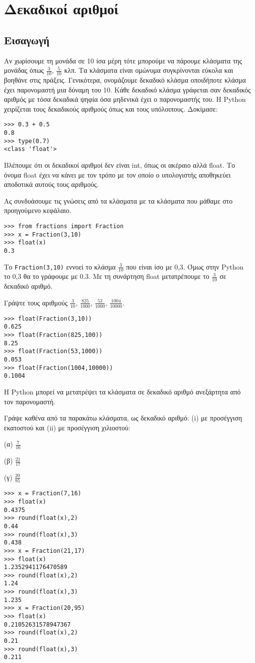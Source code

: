 \chapter{Δεκαδικοί αριθμοί}
\section{Εισαγωγή}
Αν χωρίσουμε τη μονάδα σε 10 ίσα μέρη τότε μπορούμε να πάρουμε κλάσματα της μονάδας όπως $\frac{3}{10}$, $\frac{5}{10}$ κλπ. Τα κλάσματα είναι ομώνυμα συγκρίνονται εύκολα και βοηθάνε στις πράξεις. 
Γενικότερα, ονομάζουμε δεκαδικό κλάσμα οποιδήποτε κλάσμα έχει παρονομαστή μια δύναμη του 10. Κάθε δεκαδικό κλάσμα γράφεται σαν δεκαδικός αριθμός με τόσα δεκαδικά ψηφία όσα μηδενικά έχει ο παρονομαστής του.
Η Python χειρίζεται τους δεκαδικούς αριθμούς όπως και τους υπόλοιπους.
Δοκίμασε:
\begin{lstlisting}
>>> 0.3 + 0.5
0.8
>>> type(0.7)
<class 'float'>
\end{lstlisting}

Βλέπουμε ότι οι δεκαδικοί αριθμοί δεν είναι int, όπως οι ακέραιο αλλά float. Το όνομα float έχει να κάνει με τον τρόπο με τον οποίο ο υπολογιστής αποθηκεύει αποδοτικά αυτούς τους αριθμούς. 

Ας συνδυάσουμε τις γνώσεις από τα κλάσματα με τα κλάσματα που μάθαμε στο προηγούμενο κεφάλαιο.
\begin{lstlisting}
>>> from fractions import Fraction
>>> x = Fraction(3,10)
>>> float(x)
0.3
\end{lstlisting}

Το \lstinline{Fraction(3,10)} εννοεί το κλάσμα $\frac{3}{10}$ που είναι ίσο με 0,3. Όμως στην Python το 0,3 θα το γράφουμε με 0.3. Με τη συνάρτηση float μετατρέπουμε το $\frac{3}{10}$ σε δεκαδικό αριθμό.

\begin{exercise}
 Γράψτε τους αριθμούς $\frac{3}{10}$, $\frac{825}{1000}$, $\frac{53}{1000}$, $\frac{1004}{10000}$.
\end{exercise}
\begin{lstlisting}
>>> float(Fraction(3,10))
0.625
>>> float(Fraction(825,100))
8.25
>>> float(Fraction(53,1000))
0.053
>>> float(Fraction(1004,10000))
0.1004
\end{lstlisting}

Η Python μπορεί να μετατρέψει τα κλάσματα σε δεκαδικό αριθμό ανεξάρτητα από τον παρονομαστή.
\begin{exercise}
 Γράψε καθένα από τα παρακάτω κλάσματα, ως δεκαδικό αριθμό: (i) με προσέγγιση
εκατοστού και (ii) με προσέγγιση χιλιοστού: 

(α) $\frac{7}{16}$

(β) $\frac{21}{17}$

(γ) $\frac{20}{95}$
\end{exercise}
\begin{lstlisting}
>>> x = Fraction(7,16)
>>> float(x)
0.4375
>>> round(float(x),2)
0.44
>>> round(float(x),3)
0.438
>>> x = Fraction(21,17)
>>> float(x)
1.2352941176470589
>>> round(float(x),2)
1.24
>>> round(float(x),3)
1.235
>>> x = Fraction(20,95)
>>> float(x)
0.21052631578947367
>>> round(float(x),2)
0.21
>>> round(float(x),3)
0.211
\end{lstlisting}


